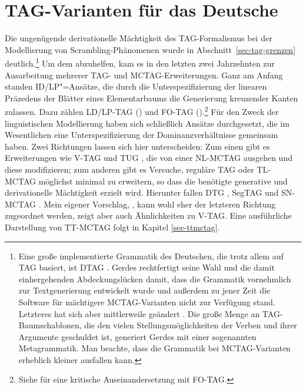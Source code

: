 \section{TAG-Varianten für das Deutsche} \label{sec-tag-varianten}

Die ungenügende derivationelle Mächtigkeit des TAG-Formalismus bei der Modellierung von Scrambling-Phänomenen wurde in Abschnitt~\ref{sec-tag-grenzen} deutlich.\footnote{Eine große implementierte Grammatik des Deutschen, die trotz allem auf TAG basiert, ist DTAG \citep{Gerdes:02,Gerdes:02b}. Gerdes rechtfertigt seine Wahl und die damit einhergehenden Abdeckungslücken damit, dass die Grammatik vornehmlich zur Textgenerierung entwickelt wurde und außerdem zu jener Zeit die Software für mächtigere MCTAG-Varianten nicht zur Verfügung stand. Letzteres hat sich aber mittlerweile geändert \citep{Parmentier:etal:07,Kallmeyer:etal:08}. Die große Menge an TAG-Baumschablonen, die den vielen Stellungsmöglichkeiten der Verben und ihrer Argumente geschuldet ist, generiert Gerdes mit einer sogenannten Metagrammatik. Man beachte, dass die Grammatik bei MCTAG-Varianten erheblich kleiner ausfallen kann.} Um dem abzuhelfen, kam es in den letzten zwei Jahrzehnten zur Ausarbeitung mehrerer TAG- und MCTAG-Erweiterungen. Ganz am Anfang standen ID/LP"=Ansätze, die durch die Unterspezifizierung der linearen Präzedens der Blätter eines Elementarbaums die Generierung kreuzender Kanten zulassen. Dazu zählen LD/LP-TAG (\citealt{Joshi:87b, Joshi:etal:90}) und FO-TAG (\citealt{Becker:Joshi:Rambow:91, Becker:94}).\footnote{Siehe \citet[43ff]{Rambow:94} für eine kritische Auseinandersetzung mit FO-TAG.} Für den Zweck der linguistischen Modellierung haben sich schlie\ss lich Ansätze durchgesetzt, die im Wesentlichen eine Unterspezifizierung der Dominanzverhältnisse gemeinsam haben. Zwei Richtungen lassen sich hier unterscheiden: Zum einen gibt es Erweiterungen wie V-TAG \citep{Rambow:94} und TUG \citep{Gerdes:04}, die von einer NL-MCTAG ausgehen und diese modifizieren; zum anderen gibt es Versuche, reguläre TAG oder TL-MCTAG möglichst minimal zu erweitern, so dass die benötigte generative und derivationelle Mächtigkeit erzielt wird. Hierunter fallen DTG \citep{Rambow:etal:95}, SegTAG \citep{Kulick:00} und SN-MCTAG \citep{Kallmeyer:05}. Mein eigener Vorschlag, , kann wohl eher der letzteren  Richtung zugeordnet werden, zeigt aber auch Ähnlichkeiten zu V-TAG. Eine ausführliche Darstellung von TT-MCTAG folgt in Kapitel \ref{sec-ttmctag}. 

